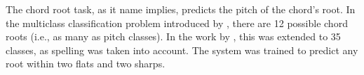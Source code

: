 
The chord root task, as it name implies, predicts the pitch
of the chord's root. In the multiclass classification
problem introduced by \textcite{chen2018functional}, there
are 12 possible chord roots (i.e., as many as pitch
classes). In the work by \textcite{micchi2020not}, this was
extended to 35 classes, as spelling was taken into account.
The system was trained to predict any root within two flats and two sharps. 
